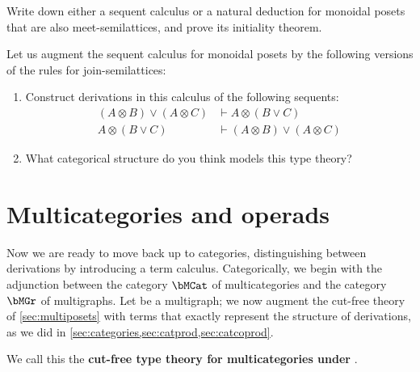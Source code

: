 \documentclass{book}
\let\types\vdash
\def\type{\;\ftype}
\let\join\vee
\let\tensor\otimes
\begin{document}
\begin{ex}\label{ex:monpos-mslat}
  Write down either a sequent calculus or a natural deduction for monoidal posets that are also meet-semilattices, and prove its initiality theorem.
\end{ex}

\begin{ex}\label{ex:monpos-jslat}
  Let us augment the sequent calculus for monoidal posets by the following versions of the rules for join-semilattices:
  \begin{enumerate}
  \item Construct derivations in this calculus of the following sequents:
    \begin{align*}
      (A\tensor B)\join (A\tensor C) &\types  A\tensor (B\join C)\\
      A\tensor (B\join C) &\types (A\tensor B)\join (A\tensor C)
    \end{align*}
  \item What categorical structure do you think models this type theory?
  \end{enumerate}
\end{ex}


\section{Multicategories and operads}
\label{sec:multicat-operads}

Now we are ready to move back up to categories, distinguishing between derivations by introducing a term calculus.
Categorically, we begin with the adjunction between the category $\bMCat$ of multicategories and the category $\bMGr$ of multigraphs.
Let \cG be a multigraph; we now augment the cut-free theory of \cref{sec:multiposets} with terms that exactly represent the structure of derivations, as we did in \cref{sec:categories,sec:catprod,sec:catcoprod}.
We call this the \textbf{cut-free type theory for multicategories under \cG}.
\end{document}
